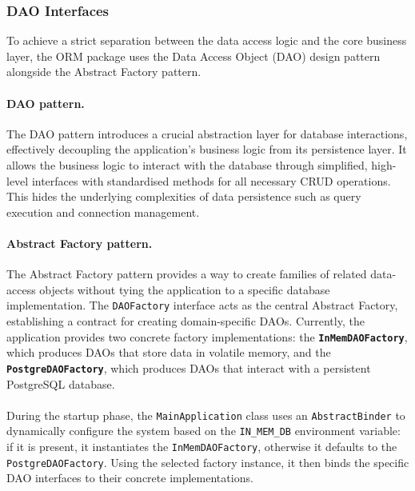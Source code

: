 \subsubsection{DAO Interfaces}
To achieve a strict separation between the data access logic and the core business layer, the ORM package uses the Data Access Object (DAO) design pattern alongside the Abstract Factory pattern. 

\paragraph{DAO pattern.}
The DAO pattern introduces a crucial abstraction layer for database interactions, effectively decoupling the application’s business logic from its persistence layer. It allows the business logic to interact with the database through simplified, high-level interfaces with standardised methods for all necessary CRUD operations. This hides the underlying complexities of data persistence such as query execution and connection management.

\paragraph{Abstract Factory pattern.}
The Abstract Factory pattern provides a way to create families of related data-access objects without tying the application to a specific database implementation.
The \texttt{DAOFactory} interface acts as the central Abstract Factory, establishing a contract for creating domain-specific DAOs. Currently, the application provides two concrete factory implementations:
	the \textbf{\texttt{InMemDAOFactory}}, which produces DAOs that store data in volatile memory, and the
 \textbf{\texttt{PostgreDAOFactory}}, which produces DAOs that interact with a persistent PostgreSQL database.

\paragraph{}
During the startup phase, the \texttt{MainApplication} class uses an \texttt{AbstractBinder} to dynamically configure the system based on the \texttt{IN\_MEM\_DB} environment variable: if it is present, it instantiates the \texttt{InMemDAOFactory}, otherwise it defaults to the \texttt{PostgreDAOFactory}. Using the selected factory instance, it then binds the specific DAO interfaces to their concrete implementations.

